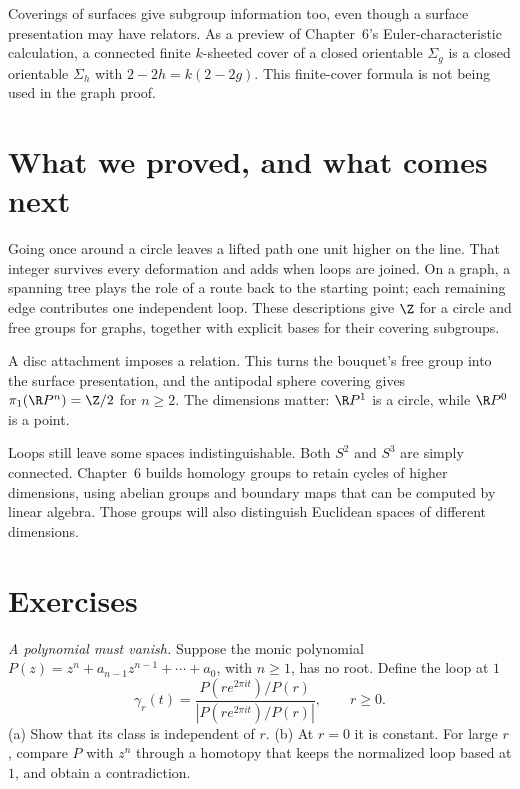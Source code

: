 \begin{remark}
Coverings of surfaces give subgroup information too, even though a surface presentation may have relators. As a preview of Chapter~6's Euler-characteristic calculation, a connected finite $k$-sheeted cover of a closed orientable $\Sigma_g$ is a closed orientable $\Sigma_h$ with $2-2h=k(2-2g)$. This finite-cover formula is not being used in the graph proof.
\end{remark}

\section{What we proved, and what comes next}

Going once around a circle leaves a lifted path one unit higher on the line. That integer survives every deformation and adds when loops are joined. On a graph, a spanning tree plays the role of a route back to the starting point; each remaining edge contributes one independent loop. These descriptions give $\Z$ for a circle and free groups for graphs, together with explicit bases for their covering subgroups.

A disc attachment imposes a relation. This turns the bouquet's free group into the surface presentation, and the antipodal sphere covering gives $\pi_1(\R P^n)=\Z/2$ for $n\ge2$. The dimensions matter: $\R P^1$ is a circle, while $\R P^0$ is a point.

Loops still leave some spaces indistinguishable. Both $S^2$ and $S^3$ are simply connected. Chapter~6 builds homology groups to retain cycles of higher dimensions, using abelian groups and boundary maps that can be computed by linear algebra. Those groups will also distinguish Euclidean spaces of different dimensions.

\section{Exercises}

\begin{exercise}[$\star$]\label{ex:fta}
\emph{A polynomial must vanish.} Suppose the monic polynomial $P(z)=z^n+a_{n-1}z^{n-1}+\cdots+a_0$, with $n\ge1$, has no root. Define the loop at $1$
\[
\gamma_r(t)=\frac{P(re^{2\pi it})/P(r)}{|P(re^{2\pi it})/P(r)|},\qquad r\ge0.
\]
(a) Show that its class is independent of $r$. (b) At $r=0$ it is constant. For large $r$, compare $P$ with $z^n$ through a homotopy that keeps the normalized loop based at $1$, and obtain a contradiction.
\end{exercise}

